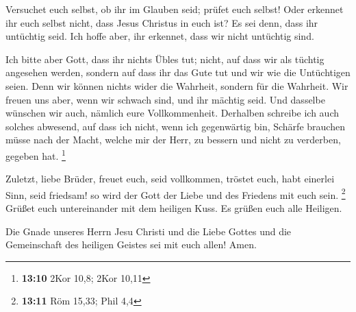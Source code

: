  Versuchet euch selbst, ob ihr im Glauben seid; prüfet
euch selbst! Oder erkennet ihr euch selbst nicht, dass Jesus Christus in
euch ist? Es sei denn, dass ihr untüchtig seid.  Ich hoffe
aber, ihr erkennet, dass wir nicht untüchtig sind.

 Ich bitte aber Gott, dass ihr nichts Übles tut; nicht,
auf dass wir als tüchtig angesehen werden, sondern auf dass ihr das Gute
tut und wir wie die Untüchtigen seien.  Denn wir können
nichts wider die Wahrheit, sondern für die Wahrheit.  Wir
freuen uns aber, wenn wir schwach sind, und ihr mächtig seid. Und
dasselbe wünschen wir auch, nämlich eure Vollkommenheit. 
Derhalben schreibe ich auch solches abwesend, auf dass ich nicht, wenn
ich gegenwärtig bin, Schärfe brauchen müsse nach der Macht, welche mir
der Herr, zu bessern und nicht zu verderben, gegeben hat. \footnote{\textbf{13:10}
  2Kor 10,8; 2Kor 10,11}

 Zuletzt, liebe Brüder, freuet euch, seid vollkommen,
tröstet euch, habt einerlei Sinn, seid friedsam! so wird der Gott der
Liebe und des Friedens mit euch sein. \footnote{\textbf{13:11} Röm
  15,33; Phil 4,4}  Grüßet euch untereinander mit dem
heiligen Kuss. Es grüßen euch alle Heiligen.

 Die Gnade unseres Herrn Jesu Christi und die Liebe
Gottes und die Gemeinschaft des heiligen Geistes sei mit euch allen!
Amen.
